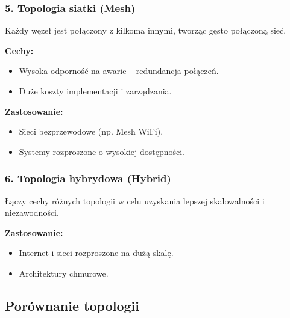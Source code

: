 \subsubsection{5. Topologia siatki (Mesh)}
Każdy węzeł jest połączony z kilkoma innymi, tworząc gęsto połączoną sieć.

\textbf{Cechy:}
\begin{itemize}
    \item Wysoka odporność na awarie – redundancja połączeń.
    \item Duże koszty implementacji i zarządzania.
\end{itemize}

\textbf{Zastosowanie:}
\begin{itemize}
    \item Sieci bezprzewodowe (np. Mesh WiFi).
    \item Systemy rozproszone o wysokiej dostępności.
\end{itemize}

\subsubsection{6. Topologia hybrydowa (Hybrid)}
Łączy cechy różnych topologii w celu uzyskania lepszej skalowalności i niezawodności.

\textbf{Zastosowanie:}
\begin{itemize}
    \item Internet i sieci rozproszone na dużą skalę.
    \item Architektury chmurowe.
\end{itemize}

\subsection{Porównanie topologii}

